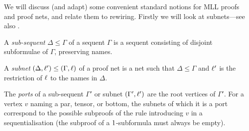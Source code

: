 \documentclass{lmcs}
\let\capsabbrev=\uppercase
\begin{document}
We will discuss (and adapt) some convenient standard notions for \capsabbrev{mll} proofs and proof nets, and relate them to rewiring.
%
Firstly we will look at subnets---see also \cite{Bellin-vandeWiele-1995}.


\begin{definition}
A \emph{sub-sequent} $\Delta\leq\Gamma$ of a sequent $\Gamma$ is a sequent consisting of disjoint subformulae of $\Gamma$, preserving names.
\end{definition}

\begin{definition}
A \emph{subnet} $(\Delta,\ell') \leq (\Gamma,\ell)$ of a proof net is a net such that $\Delta\leq\Gamma$ and $\ell'$ is the restriction of $\ell$ to the names in $\Delta$.
\end{definition}



The \emph{ports} of a sub-sequent $\Gamma'$ or subnet $(\Gamma',\ell')$ are the root vertices of $\Gamma'$.
%
For a vertex $v$ naming a par, tensor, or bottom, the subnets of which it is a port correspond to the possible subproofs of the rule introducing $v$ in a sequentialisation (the subproof of a $1$-subformula must always be empty).
\end{document}
